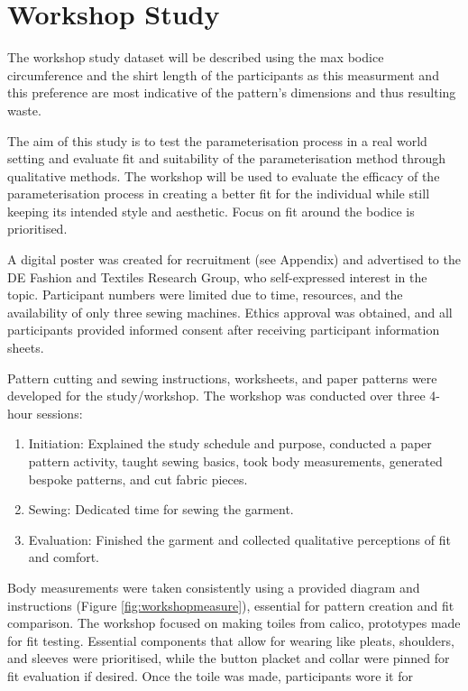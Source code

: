 \section{Workshop Study}
The workshop study dataset will be described using the max bodice circumference and the shirt length of the participants as this measurment and this preference are most indicative of the pattern's dimensions and thus resulting waste.

The aim of this study is to test the parameterisation process in a real world setting and evaluate fit and suitability of the parameterisation method through qualitative methods. The workshop will be used to evaluate the efficacy of the parameterisation process in creating a better fit for the individual while still keeping its intended style and aesthetic. Focus on fit around the bodice is prioritised.

A digital poster was created for recruitment (see Appendix) and advertised to the DE Fashion and Textiles Research Group, who self-expressed interest in the topic. Participant numbers were limited due to time, resources, and the availability of only three sewing machines. Ethics approval was obtained, and all participants provided informed consent after receiving participant information sheets.

Pattern cutting and sewing instructions, worksheets, and paper patterns were developed for the study/workshop. The workshop was conducted over three 4-hour sessions:

\begin{enumerate}
    \item Initiation: Explained the study schedule and purpose, conducted a paper pattern activity, taught sewing basics, took body measurements, generated bespoke patterns, and cut fabric pieces.
    \item Sewing: Dedicated time for sewing the garment.
    \item Evaluation: Finished the garment and collected qualitative perceptions of fit and comfort.
\end{enumerate}
Body measurements were taken consistently using a provided diagram and instructions (Figure \ref{fig:workshopmeasure}), essential for pattern creation and fit comparison. The workshop focused on making toiles from calico, prototypes made for fit testing. Essential components that allow for wearing like pleats, shoulders, and sleeves were prioritised, while the button placket and collar were pinned for fit evaluation if desired. Once the toile was made, participants wore it for


